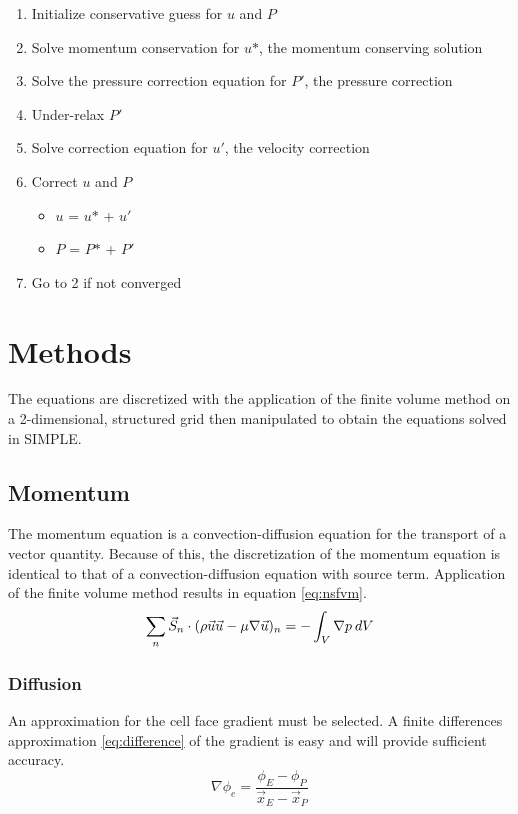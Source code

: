 \documentclass[12pt,twocolumn]{article}
\newcommand{\st}[0]{\text{*}}
\begin{document}
\begin{enumerate}
\item Initialize conservative guess for $u$ and $P$
\item Solve momentum conservation for $u\st$, the momentum conserving solution
\item Solve the pressure correction equation for $P'$, the pressure correction
\item Under-relax $P'$
\item Solve correction equation for $u'$, the velocity correction
\item Correct $u$ and $P$
\begin{itemize}
	\item $u$ = $u\st$ + $u'$
	\item $P$ = $P\st$ + $P'$
\end{itemize}
\item Go to 2 if not converged
\end{enumerate}

\section*{Methods}
The equations are discretized with the application of the finite volume method on a 2-dimensional, structured grid then manipulated to obtain the equations solved in SIMPLE.
\subsection*{Momentum}
The momentum equation is a convection-diffusion equation for the transport of a vector quantity.
Because of this, the discretization of the momentum equation is identical to that of a convection-diffusion equation with source term.
Application of the finite volume method results in equation \eqref{eq:nsfvm}.
\begin{equation}\label{eq:nsfvm}\sum\limits_n \vec S_n\cdot(\rho\vec u\vec u-\mu\nabla\vec u)_n= -\int_V\nabla p \hspace{.5ex}dV\end{equation} %
\subsubsection*{Diffusion}
An approximation for the cell face gradient must be selected.
A finite differences approximation \eqref{eq:difference} of the gradient is easy and will provide sufficient accuracy.
\begin{equation}\label{eq:difference}\nabla\phi_e = \frac{\phi_E - \phi_P}{\vec x_E - \vec x_P}\end{equation}
\end{document}
